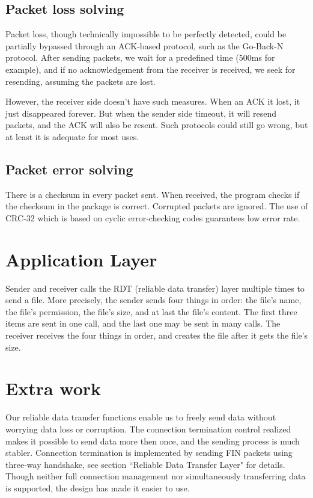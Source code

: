 \documentclass[10pt,a4paper]{article}
\begin{document}
    \subsection{Packet loss solving}
        Packet loss, though technically impossible to be perfectly detected, could be partially bypassed through an ACK-based protocol, such as the Go-Back-N protocol. After sending packets, we wait for a predefined time ($500$ms for example), and if no acknowledgement from the receiver is received, we seek for resending, assuming the packets are lost.

       	However, the receiver side doesn't have such measures. When an ACK it lost, it just disappeared forever. But when the sender side timeout, it will resend packets, and the ACK will also be resent. Such protocols could still go wrong, but at least it is adequate for most uses.
    \subsection{Packet error solving}
        There is a checksum in every packet sent. When received, the program checks if the checksum in the package is correct. Corrupted packets are ignored. The use of CRC-32 which is based on cyclic error-checking codes guarantees low error rate.

\section{Application Layer}
    Sender and receiver calls the RDT (reliable data transfer) layer multiple times to send a file. More precisely, the sender sends four things in order: the file's name, the file's permission, the file's size, and at last the file's content. The first three items are sent in one call, and the last one may be sent in many calls. The receiver receives the four things in order, and creates the file after it gets the file's size.

\section{Extra work}
    Our reliable data transfer functions enable us to freely send data without worrying data loss or corruption. The connection termination control realized makes it possible to send data more then once, and the sending process is much stabler. Connection termination is implemented by sending FIN packets using three-way handshake, see section ``Reliable Data Transfer Layer" for details. Though neither full connection management nor simultaneously transferring data is supported, the design has made it easier to use.
\end{document}
